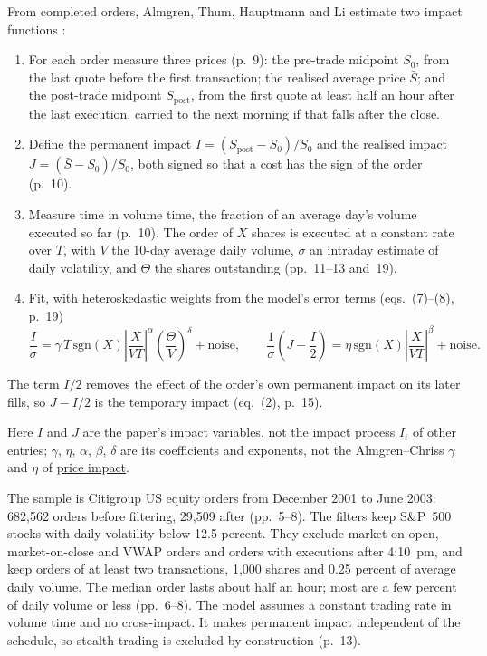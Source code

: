 \begin{qfmethod}\label{meth:almgren-impact-estimation}
 From completed orders, Almgren, Thum, Hauptmann and Li estimate two impact functions \citep[authors' preprint of 10 May 2005, secs.~2.2--4.3, pp.~8--21]{wide-almgren-direct-impact}:
\begin{enumerate}
\item For each order measure three prices (p.~9): the pre-trade midpoint $S_0$, from the last quote before the first transaction; the realised average price $\bar S$; and the post-trade midpoint $S_{\mathrm{post}}$, from the first quote at least half an hour after the last execution, carried to the next morning if that falls after the close.
\item Define the permanent impact $I=(S_{\mathrm{post}}-S_0)/S_0$ and the realised impact $J=(\bar S-S_0)/S_0$, both signed so that a cost has the sign of the order (p.~10).
\item Measure time in volume time, the fraction of an average day's volume executed so far (p.~10). The order of $X$ shares is executed at a constant rate over $T$, with $V$ the 10-day average daily volume, $\sigma$ an intraday estimate of daily volatility, and $\Theta$ the shares outstanding (pp.~11--13 and~19).
\item Fit, with heteroskedastic weights from the model's error terms (eqs.~(7)--(8), p.~19)
\[ \frac{I}{\sigma}=\gamma\,T\,\mathrm{sgn}(X)\left|\frac{X}{VT}\right|^{\alpha}\left(\frac{\Theta}{V}\right)^{\delta}+\text{noise},\qquad \frac1\sigma\left(J-\frac I2\right)=\eta\,\mathrm{sgn}(X)\left|\frac{X}{VT}\right|^{\beta}+\text{noise}. \]
\end{enumerate}
The term $I/2$ removes the effect of the order's own permanent impact on its later fills, so $J-I/2$ is the temporary impact (eq.~(2), p.~15).

 Here $I$ and $J$ are the paper's impact variables, not the impact process $I_t$ of other entries; $\gamma$, $\eta$, $\alpha$, $\beta$, $\delta$ are its coefficients and exponents, not the Almgren--Chriss $\gamma$ and $\eta$ of \hyperref[def:price-impact]{price impact}.

 The sample is Citigroup US equity orders from December 2001 to June 2003: 682{,}562 orders before filtering, 29{,}509 after (pp.~5--8). The filters keep S\&P~500 stocks with daily volatility below 12.5 percent. They exclude market-on-open, market-on-close and VWAP orders and orders with executions after 4:10~pm, and keep orders of at least two transactions, 1{,}000 shares and 0.25 percent of average daily volume. The median order lasts about half an hour; most are a few percent of daily volume or less (pp.~6--8). The model assumes a constant trading rate in volume time and no cross-impact. It makes permanent impact independent of the schedule, so stealth trading is excluded by construction (p.~13).


\end{qfmethod}
